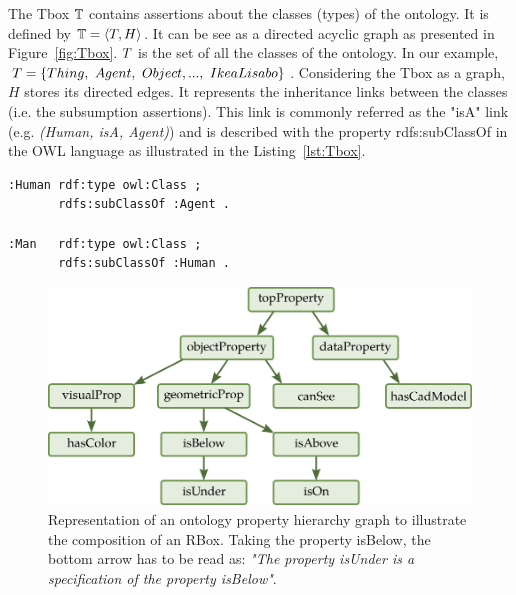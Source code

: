 The Tbox $\mathbb{T}$ contains assertions about the classes (types) of the ontology. It is defined by $\mathbb{T} = \langle T, H \rangle$. It can be see as a directed acyclic graph as presented in Figure~\ref{fig:Tbox}. $T$ is the set of all the classes of the ontology. In our example, $T = \{Thing,\ Agent,\ Object, ...,\ IkeaLisabo\}$. Considering the Tbox as a graph, $H$ stores its directed edges. It represents the inheritance links between the classes (i.e. the subsumption assertions). This link is commonly referred as the "isA" link (e.g. \textit{(Human, isA, Agent)}) and is described with the property rdfs:subClassOf in the OWL language as illustrated in the Listing~\ref{lst:Tbox}.

\begin{lstlisting}[frame=single, basicstyle=\scriptsize\ttfamily, label={lst:Tbox}, caption={Description of ontology classes in the OWL language using the Turle syntax.},captionpos=b]
:Human rdf:type owl:Class ;
       rdfs:subClassOf :Agent .

:Man   rdf:type owl:Class ;
       rdfs:subClassOf :Human .
\end{lstlisting}

\begin{figure}[h!]
\centering
\includegraphics[scale=0.4]{figures/chapter2/Rbox.png}
\caption{\label{fig:Rbox} Representation of an ontology property hierarchy graph to illustrate the composition of an RBox. Taking the property isBelow, the bottom arrow has to be read as: \textit{"The property isUnder is a specification of the property isBelow"}.}
\end{figure}

